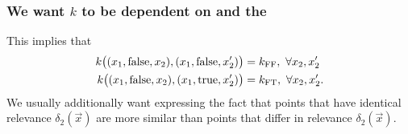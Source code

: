 \documentclass[12pt,onlymath]{beamer}
\begin{document}

\begin{frame}\frametitle{We want $k$ to be dependent on  and the }

This implies that
\begin{align*}
k\bigl((x_1, \textnormal{false}, x_2), (x_1, \textnormal{false}, x_2') \bigr)
& = k_{\text{FF}},\ \forall x_2, x_2'\\
k\bigl((x_1, \textnormal{false}, x_2), (x_1, \textnormal{true}, x_2') \bigr)
& = k_{\text{FT}},\ \forall x_2, x_2'.
\end{align*}
\vfill
We usually additionally want 
%
expressing the fact that points that have identical relevance $\delta_2({\vec{x}})$ are more similar than points that differ in relevance $\delta_2({\vec{x}})$.

\end{frame}
\end{document}
